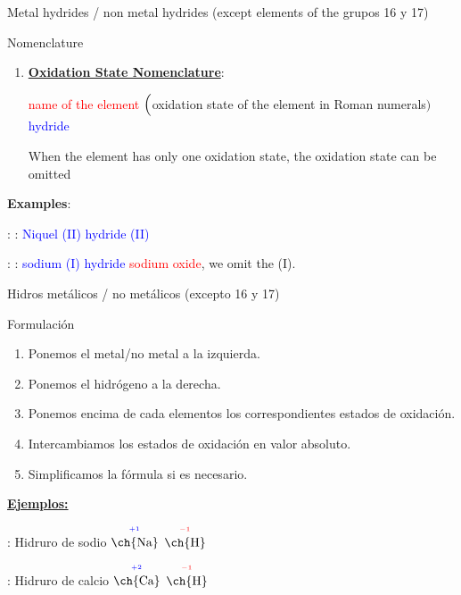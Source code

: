 \documentclass{beamer}
\newcommand*{\numberballmDarkTeal}{\protect\cnumero{\arabic*}{mDarkTeal}}
\newcommand{\eo}[3]{$\overset{^{\color{#1}#2}}{\text{\ch{#3}}}$}
\newcommand{\eob}[2]{$\overset{^{\color{blue}#1}}{\text{\ch{#2}}}$}
\newcommand{\eor}[2]{$\overset{^{\color{red}#1}}{\text{\ch{#2}}}$}
\begin{document}
\begin{frame}[t]{ Metal hydrides / non metal hydrides (except  elements of the grupos 16 y 17)}
    \begin{alertblock}{\Large Nomenclature} 

        \begin{enumerate}[start=2,label=\numberballmDarkTeal]
            \item \textbf{\uline{Oxidation State Nomenclature}}:
                  \begin{center}
                    \textcolor{red}{name of the element} $\Bigl($\textcolor{green!50!black}{oxidation state of the element in Roman numerals}$\Bigr)$ \textcolor{blue}{hydride} 
                  \end{center}
                  When the element has only one oxidation state, the oxidation state can be omitted
        \end{enumerate}

        \textbf{Examples}:

         : : \textcolor{blue}{Niquel (II) hydride (II)}

         : : \textcolor{blue}{sodium (I) hydride} \ch{->} \textcolor{red}{sodium oxide}, we omit the (I).
    \end{alertblock}
\end{frame}



\begin{frame}[t]{Hidros metálicos / no metálicos (excepto 16 y 17)}
    \begin{exampleblock}{\Large{Formulación}}\vspace*{5pt}
        \begin{enumerate}[label=\itembolascolor{\arabic*}{mDarkTeal}]
            \item Ponemos el metal/no metal a la izquierda.
            \item Ponemos el hidrógeno a la derecha.
            \item Ponemos encima de cada elementos los correspondientes estados de oxidación.
            \item Intercambiamos los estados de oxidación en valor absoluto.
            \item Simplificamos la fórmula si es necesario.
        \end{enumerate}

        \textbf{\uline{Ejemplos:}}

         : Hidruro de sodio \ch{->} \eo{blue}{+1}{Na} \eor{-1}{H}  \ch{->} 

         : Hidruro de calcio \ch{->} \eob{+2}{Ca} \eor{-1}{H}  \ch{->} 
    \end{exampleblock}
\end{frame}
\end{document}
